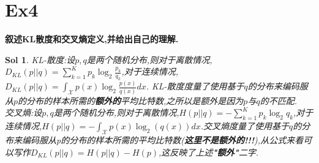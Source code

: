 \documentclass[UTF8,a4paper,11pt]{ctexart}
\newtheorem{sol}{Sol}[section]
\begin{document}
\section{Ex4}
\textbf{叙述KL散度和交叉熵定义,并给出自己的理解.}
\begin{sol}
	KL-散度:设$p,q$是两个随机分布,则对于离散情况,$D_{KL}(p||q)=\sum_{k=1}^{K}p_{k}\log_{2}\frac{p_{k}}{q_{k}}$,对于连续情况,$D_{KL}(p||q)=\int_{\mathcal{X}}p(x)\log_{2}\frac{p(x)}{q(x)}dx$. KL-散度度量了使用基于$q$的分布来编码服从$p$的分布的样本所需的\textbf{额外的}平均比特数,之所以是额外是因为$p$与$q$的不匹配.\\
	交叉熵:设$p,q$是两个随机分布,则对于离散情况,$H(p||q)=-\sum_{k=1}^{K}p_{k}\log_{2}q_{k}$,对于连续情况,$H(p||q)=-\int_{\mathcal{X}}p(x)\log_{2}(q(x))dx$.交叉熵度量了使用基于$q$的分布来编码服从p的分布的样本所需的平均比特数(\textbf{这里不是额外的!!!}),从公式来看可以写作$D_{KL}(p||q)=H(p||q)-H(p)$,这反映了上述\textbf{"额外"}二字.\\
\end{sol}
\end{document}
